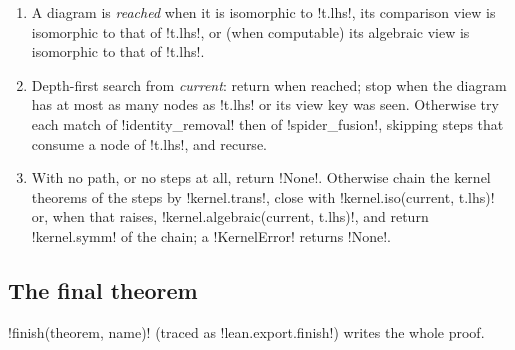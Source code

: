{\begin{algorithm}\label{alg:lean-export-net-tidy}
\begin{enumerate}
\item A diagram is \textit{reached} when it is isomorphic to \code!t.lhs!, its comparison view is
  isomorphic to that of \code!t.lhs!, or (when computable) its algebraic view is isomorphic to
  that of \code!t.lhs!.
\item Depth-first search from \textit{current}: return when reached; stop when the diagram has at
  most as many nodes as \code!t.lhs! or its view key was seen. Otherwise try each match of
  \code!identity_removal! then of \code!spider_fusion!, skipping steps that consume a node of
  \code!t.lhs!, and recurse.
\item With no path, or no steps at all, return \py!None!. Otherwise chain the kernel theorems of
  the steps by \py!kernel.trans!, close with \py!kernel.iso(current, t.lhs)! or, when that raises,
  \py!kernel.algebraic(current, t.lhs)!, and return \py!kernel.symm! of the chain; a
  \py!KernelError! returns \py!None!.
\end{enumerate}
\end{algorithm}

\subsection{The final theorem}\label{sec:lean-export-net-finish}

\py!finish(theorem, name)! (traced as \code!lean.export.finish!) writes the whole proof.

}
